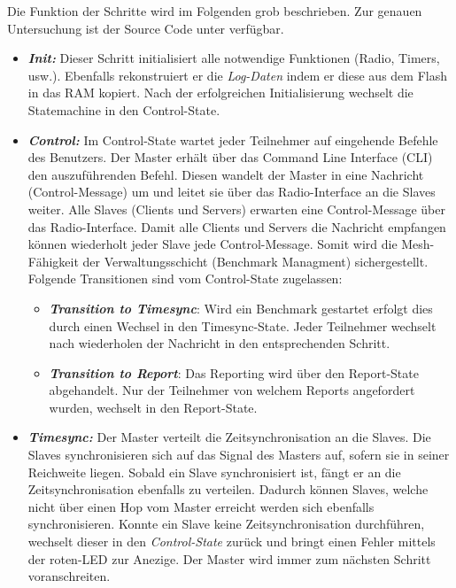 Die Funktion der Schritte wird im Folgenden grob beschrieben. Zur genauen Untersuchung ist der Source Code unter \cite{rouben94_sharedlib_software_git_2020} verfügbar.  \\

\begin{itemize}
	\item \textbf{\textit{Init:}} Dieser Schritt initialisiert alle notwendige Funktionen (Radio, Timers, usw.). Ebenfalls rekonstruiert er die \textit{Log-Daten} indem er diese aus dem Flash in das RAM kopiert. Nach der erfolgreichen Initialisierung wechselt die Statemachine in den Control-State.
	\item \textbf{\textit{Control:}} Im Control-State wartet jeder Teilnehmer auf eingehende Befehle des Benutzers. Der Master erhält über das Command Line Interface (CLI) den auszuführenden Befehl. Diesen wandelt der Master in eine Nachricht (Control-Message) um und leitet sie über das Radio-Interface an die Slaves weiter.  Alle Slaves (Clients und Servers) erwarten eine Control-Message über das Radio-Interface. Damit alle Clients und Servers die Nachricht empfangen können wiederholt jeder Slave jede Control-Message. Somit wird die Mesh-Fähigkeit der Verwaltungsschicht (Benchmark Managment) sichergestellt. Folgende Transitionen sind vom Control-State zugelassen: 
	\begin{itemize}
		\item \textit{\textbf{Transition to Timesync}}: Wird ein Benchmark gestartet erfolgt dies durch einen Wechsel in den Timesync-State. Jeder Teilnehmer wechselt nach wiederholen der Nachricht in den entsprechenden Schritt. 
		\item \textit{\textbf{Transition to Report}}: Das Reporting wird über den Report-State abgehandelt. Nur der Teilnehmer von welchem Reports angefordert wurden, wechselt in den Report-State. 
	\end{itemize} 	
	\item \textbf{\textit{Timesync:}} Der Master verteilt die Zeitsynchronisation an die Slaves. Die Slaves synchronisieren sich auf das Signal des Masters auf, sofern sie in seiner Reichweite liegen. Sobald ein Slave synchronisiert ist, fängt er an die Zeitsynchronisation ebenfalls zu verteilen. Dadurch können Slaves, welche nicht über einen Hop vom Master erreicht werden sich ebenfalls synchronisieren. Konnte ein Slave keine Zeitsynchronisation durchführen, wechselt dieser in den  \textit{Control-State} zurück und bringt einen Fehler mittels der roten-LED zur Anezige. Der Master wird immer zum nächsten Schritt voranschreiten. 	

\end{itemize}
